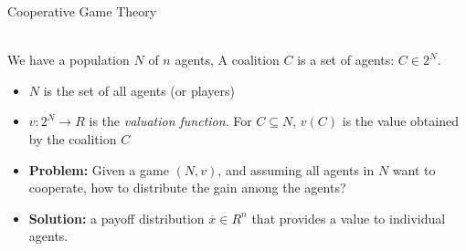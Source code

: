 \documentclass{beamer}
\begin{document}
\begin{frame}{Cooperative Game Theory}
    \begin{definition} [Coalition]~\\
       We have a population $N$ of $n$ agents, A coalition $C$ is a set of agents: $C \in 2^N$.
        \begin{itemize}
            \item $N$ is the set of all agents (or players)
            \item $v:2^N \rightarrow R$ is the \emph{valuation function}. For $C \subseteq N$, $v(C)$ is the value obtained by the coalition $C$
        \end{itemize}
    \end{definition}

    \begin{itemize}
        \item \textbf{Problem:} Given a game $(N,v)$, and assuming all agents in $N$ want to cooperate, how to distribute the gain among the agents?
        \item \textbf{Solution:} a payoff distribution $\overline{x} \in R^n$ that provides a value to individual agents.


    \end{itemize}
\end{frame}
\end{document}
